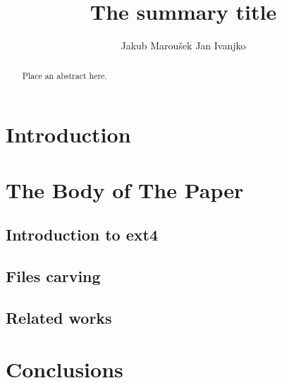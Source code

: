 \documentclass{acm_proc_article-sp}
\begin{document}
\title{The summary title}

\author{
\alignauthor
Jakub Marou\v sek
\alignauthor
Jan Ivanjko
}

\maketitle
\begin{abstract}
Place an abstract here.
\end{abstract}

\section{Introduction}

\cite{braams:babel}

\section{The {\secit Body} of The Paper}

\subsection{Introduction to ext4}

\subsection{Files carving}

\subsection{Related works}

\section{Conclusions}




\balancecolumns
\end{document}
